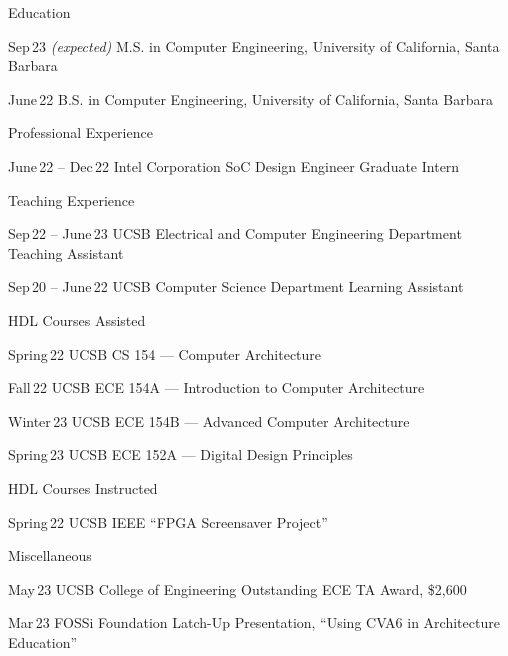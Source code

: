 \begin{vitae}

    \begin{vitaesection}{Education}
    \vspace{-0.1cm}
    \item [Sep\,23 \emph{(expected)}] M.S. in Computer Engineering, University of California, Santa Barbara
    \item [June\,22] B.S. in Computer Engineering, University of California, Santa Barbara
    \end{vitaesection}

    \begin{vitaesection}{Professional Experience}
        \vspace{-0.1cm}
        \item [June\,22 -- Dec\,22] Intel Corporation SoC Design Engineer Graduate Intern
    \end{vitaesection}

    \begin{vitaesection}{Teaching Experience}
        \vspace{-0.1cm}
        \item [Sep\,22 -- June\,23] UCSB Electrical and Computer Engineering Department Teaching Assistant
        \item [Sep\,20 -- June\,22] UCSB Computer Science Department Learning Assistant
    \end{vitaesection}

    \begin{vitaesection}{HDL Courses Assisted}
        \vspace{-0.1cm}
        \item [Spring\,22] UCSB CS 154 --- Computer Architecture
        \item [Fall\,22] UCSB ECE 154A --- Introduction to Computer Architecture
        \item [Winter\,23] UCSB ECE 154B --- Advanced Computer Architecture
        \item [Spring\,23] UCSB ECE 152A --- Digital Design Principles
    \end{vitaesection}

    \begin{vitaesection}{HDL Courses Instructed}
        \vspace{-0.1cm}
        \item [Spring\,22] UCSB IEEE \enquote{FPGA Screensaver Project}
    \end{vitaesection}

    \begin{vitaesection}{Miscellaneous}
        \vspace{-0.1cm}
        \item [May\,23] UCSB College of Engineering Outstanding ECE TA Award, \$2,600
        \item [Mar\,23] FOSSi Foundation Latch-Up Presentation, \enquote{Using CVA6 in Architecture Education}
    \end{vitaesection}

\end{vitae}
